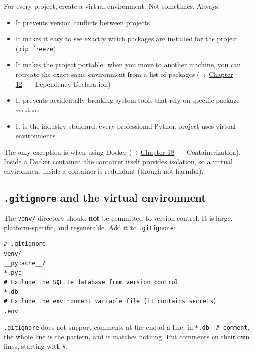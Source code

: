 For every project, create a virtual environment. Not sometimes. Always.

\begin{itemize}
\tightlist
\item
  It prevents version conflicts between projects
\item
  It makes it easy to see exactly which packages are installed for the project (\texttt{pip\ freeze})
\item
  It makes the project portable: when you move to another machine, you can recreate the exact same environment from a list of packages (→ \hyperref[ch:12-dependency-declaration]{Chapter 12}~--- Dependency Declaration)
\item
  It prevents accidentally breaking system tools that rely on specific package versions
\item
  It is the industry standard: every professional Python project uses virtual environments
\end{itemize}

\noindent{}The only exception is when using Docker (→ \hyperref[ch:18-containerization]{Chapter 18}~--- Containerization). Inside a Docker container, the container itself provides isolation, so a virtual environment inside a container is redundant (though not harmful).

\subsection*{\texorpdfstring{\texttt{.gitignore} and the virtual environment}{.gitignore and the virtual environment}}\label{06-local-dependencies:gitignore-and-the-virtual-environment}

The \texttt{venv/} directory should \textbf{not} be committed to version control. It is large, platform-specific, and regenerable. Add it to \texttt{.gitignore}:

\begin{outputbox}[short]
\begin{Verbatim}[fontsize=\codesize, breaklines, breakanywhere, breaksymbolleft={\tiny\textcolor{muted}{$\hookrightarrow$}}]
# .gitignore
venv/
__pycache__/
*.pyc
# Exclude the SQLite database from version control
*.db
# Exclude the environment variable file (it contains secrets)
.env
\end{Verbatim}
\end{outputbox}

\noindent{}\texttt{.gitignore} does not support comments at the end of a line: in \texttt{*.db\ \ \#\ comment}, the whole line is the pattern, and it matches nothing. Put comments on their own lines, starting with \texttt{\#}.

